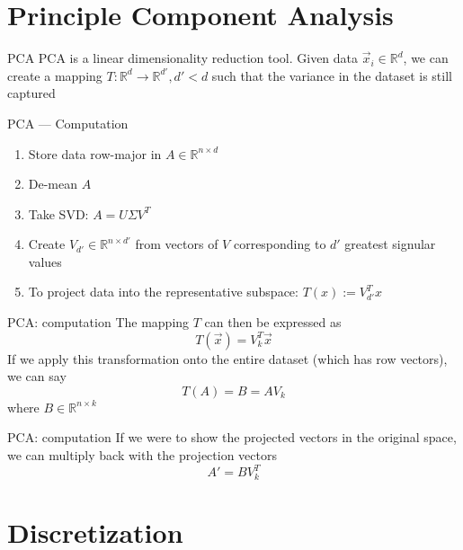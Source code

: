 \documentclass{beamer}
\begin{document}
	\section[PCA]{Principle Component Analysis}

	\begin{frame}{PCA}
	PCA is a linear dimensionality reduction tool. Given data $\vec{x}_i \in \mathbb{R}^d$, we can create a mapping $T : \mathbb{R}^d \rightarrow \mathbb{R}^{d'}, d' < d$ such that the variance in the dataset is still captured
	\end{frame}

	\begin{frame}{PCA --- Computation}
		\begin{enumerate}[<+->]
			\item Store data row-major in $A \in \mathbb{R}^{n \times d}$
			\item De-mean $A$
			\item Take SVD: $A = U \Sigma V^T$
			\item Create $V_{d'} \in \mathbb{R}^{n \times d'}$ from vectors of $V$ corresponding to $d'$ greatest signular values
			\item To project data into the representative subspace: $T(x) := V_{d'}^T x$
		\end{enumerate}
	\end{frame}

	\begin{frame}{PCA: computation}
	The mapping $T$ can then be expressed as
	\[ T(\vec{x}) = V_k^T \vec{x} \]
	If we apply this transformation onto the entire dataset (which has row vectors), we can say
	\[ T(A) = B = A V_k \]
	where $B \in \mathbb{R}^{n \times k}$
	\end{frame}
	\begin{frame}{PCA: computation}
	If we were to show the projected vectors in the original space, we can multiply back with the projection vectors
	\[ A' = B V_k^T \]
	\end{frame}

	\section{Discretization}
	
\end{document}
